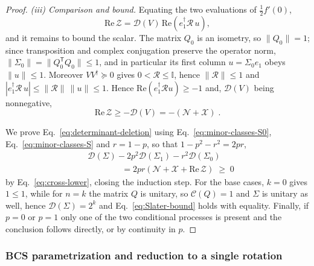 \documentclass[prx,twocolumn,superscriptaddress,aps,10pt, frontmatterverbose, reprint,footinbib,longbibliography=true]{revtex4-2}
\newcommand{\trans}{\mathsf{T}}
\providecommand{\DIFaddtex}[1]{{\protect\color{red}#1}} %
\providecommand{\DIFaddbegin}{\protect\color{red}} %
\providecommand{\DIFaddend}{\protect\color{black}} %
\providecommand{\DIFaddtex}[1]{\texorpdfstring{\DIFaddtex{#1}}{#1}} %
\providecommand{\DIFadd}[1]{\texorpdfstring{\DIFaddtex{#1}}{#1}} %
\newcommand{\DIFaddincludegraphics}[2][]{{\color{blue}\fbox{\DIFOincludegraphics[#1]{#2}}}} %
\DeclareRobustCommand{\DIFaddbegin}{\DIFOaddbegin \let\includegraphics\DIFaddincludegraphics} %
\DeclareRobustCommand{\DIFaddend}{\DIFOaddend \let\includegraphics\DIFOincludegraphics} %
\begin{document}
\begin{proof}
\emph{(iii) Comparison and bound.} Equating the two evaluations of $\tfrac12f'(0)$,
\begin{equation}
    \mathrm{Re}\,\mathcal{Z}=\mathcal{D}(V)\,\mathrm{Re}\!\left(e_1^\dagger\mathcal{R}\,u\right),
\end{equation}
and it remains to bound the scalar. The matrix $Q_0$ is an isometry, so $\lVert Q_0\rVert=1$; since transposition and complex conjugation preserve the operator norm, $\lVert\Sigma_0\rVert=\lVert Q_0^{\trans}Q_0\rVert\le1$, and in particular its first column $u=\Sigma_0e_1$ obeys $\lVert u\rVert\le1$. Moreover $VV^\dagger\succeq0$ gives $0<\mathcal{R}\le\mathbb{I}$, \DIFaddbegin \DIFadd{hence $\lVert\mathcal{R}\rVert\le1$ and $|e_1^\dagger\mathcal{R}\,u|\le\lVert\mathcal{R}\rVert\,\lVert u\rVert\le1$.
}\DIFaddend Hence $\mathrm{Re}(e_1^\dagger\mathcal{R}u)\ge-1$ and, $\mathcal{D}(V)$ being nonnegative,
\begin{equation}
    \mathrm{Re}\,\mathcal{Z}\ge-\mathcal{D}(V)=-(\mathcal{N}+\mathcal{X})\;.
    \label{eq:cross-lower}
\end{equation}

We prove Eq.~\eqref{eq:determinant-deletion} using Eq.~\eqref{eq:minor-classes-S0}, Eq.~\eqref{eq:minor-classes-S} and $r=1-p$, so that $1-p^2-r^2=2pr$,
\begin{equation}
\begin{split}
    &\mathcal{D}(\Sigma)-2p^2\mathcal{D}(\Sigma_1)-r^2\mathcal{D}(\Sigma_0)\\
    &\qquad\qquad =2pr\left(\mathcal{N}+\mathcal{X}+\mathrm{Re}\,\mathcal{Z}\right)\;\ge\;0
    \end{split}
\end{equation} 
by Eq.~\eqref{eq:cross-lower}, closing the induction step. For the base cases, $k=0$ gives $1\le1$, while for $n=k$ the matrix $Q$ is unitary, so $\mathcal{C}(Q)=1$ and $\Sigma$ is unitary as well, hence $\mathcal{D}(\Sigma)=2^k$ and Eq.~\eqref{eq:Slater-bound} holds with equality. Finally, if $p=0$ or $p=1$ only one of the two conditional processes is present and the conclusion follows directly, or by continuity in $p$.
\end{proof}

\subsubsection{ BCS parametrization and reduction to a single rotation}
\label{app:proof:thouless}
\end{document}
